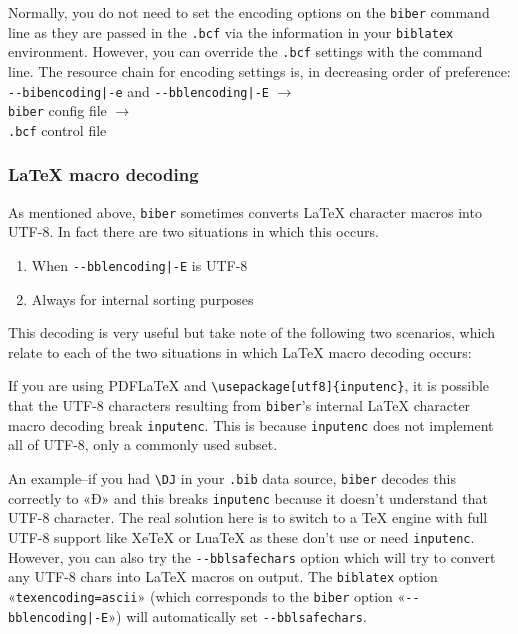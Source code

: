 \documentclass{ltxdockit}
\begin{document}
\noindent Normally, you do not need to set the encoding options on the
\verb+biber+ command line as they are passed in the \verb+.bcf+ via the
information in your \verb+biblatex+ environment. However, you can override
the \verb+.bcf+ settings with the command line. The resource chain for
encoding settings is, in decreasing order
of preference:\\[2ex]

\noindent\verb+--bibencoding|-e+ and \verb+--bblencoding|-E+ $\rightarrow$\\
\hspace*{1em}\verb+biber+ config file $\rightarrow$\\
\hspace*{2em}\verb+.bcf+ control file

\subsubsection{LaTeX macro decoding}

\noindent As mentioned above, \verb+biber+ sometimes converts LaTeX
character macros into UTF-8. In fact there are two situations in which
this occurs.

\begin{enumerate}
\item When \verb+--bblencoding|-E+ is UTF-8
\item Always for internal sorting purposes
\end{enumerate}

\noindent This decoding is very useful but take note of the following
two scenarios, which relate to each of the two situations in which
LaTeX macro decoding occurs:

If you are using PDFLaTeX and \verb+\usepackage[utf8]{inputenc}+, it
is possible that the UTF-8 characters resulting from \verb+biber+'s
internal LaTeX character macro decoding break \verb+inputenc+. This is
because \verb+inputenc+ does not implement all of UTF-8, only a
commonly used subset.

An example--if you had \verb+\DJ+ in your \verb+.bib+ data source,
\verb+biber+ decodes this correctly to «Đ» and this breaks \verb+inputenc+
because it doesn't understand that UTF-8 character. The real solution here
is to switch to a TeX engine with full UTF-8 support like XeTeX or LuaTeX
as these don't use or need \verb+inputenc+. However, you can also try the
\verb+--bblsafechars+ option which will try to convert any UTF-8 chars into
LaTeX macros on output. The \verb+biblatex+ option
«\verb+texencoding=ascii+» (which corresponds to the \verb+biber+ option
«\verb+--bblencoding|-E+») will automatically set \verb+--bblsafechars+.
\end{document}
